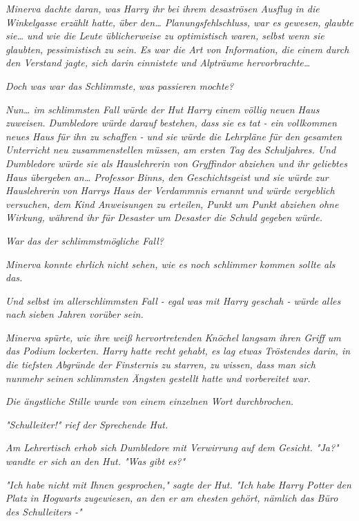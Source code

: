 {\emph{Minerva dachte daran, was Harry ihr bei ihrem desaströsen Ausflug in die Winkelgasse erzählt hatte, über den… Planungsfehlschluss, war es gewesen, glaubte sie… und wie die Leute üblicherweise zu optimistisch waren, selbst wenn sie glaubten, pessimistisch zu sein. Es war die Art von Information, die einem durch den Verstand jagte, sich darin einnistete und Alpträume hervorbrachte…}

\emph{Doch was war das} \emph{\emph{Schlimmste,}} \emph{was passieren mochte?}

\emph{Nun… im schlimmsten Fall würde der Hut Harry einem völlig neuen Haus zuweisen. Dumbledore würde darauf bestehen, dass sie es tat - ein vollkommen neues Haus für ihn zu schaffen - und sie würde die Lehrpläne für den gesamten Unterricht neu zusammenstellen müssen, am ersten Tag des Schuljahres. Und Dumbledore würde sie als Hauslehrerin von Gryffindor abziehen und ihr geliebtes Haus übergeben an… Professor Binns, den Geschichtsgeist und sie würde} \emph{zur} \emph{Hauslehrerin} \emph{von} \emph{Harrys Haus der Verdammnis ernannt und würde vergeblich versuchen, dem Kind Anweisungen zu erteilen, Punkt um Punkt abziehen ohne Wirkung, während ihr für Desaster um Desaster die Schuld gegeben würde.}

\emph{War das der schlimmstmögliche Fall?}

\emph{Minerva konnte ehrlich nicht sehen, wie es noch schlimmer kommen sollte als das.}

\emph{Und selbst im allerschlimmsten Fall - egal} \emph{\emph{was}} \emph{mit Harry geschah - würde} \emph{alles} \emph{nach} \emph{sieben Jahren vorüber sein.}

\emph{Minerva spürte, wie ihre weiß hervortretenden Knöchel langsam ihren Griff um das Podium lockerten. Harry hatte recht gehabt, es lag etwas} \emph{Tröstendes} \emph{darin, in die tiefsten Abgründe der Finsternis zu starren, zu wissen, dass man sich nunmehr seinen schlimmsten Ängsten gestellt hatte und vorbereitet war.}

\emph{Die ängstliche Stille wurde von einem einzelnen Wort durchbrochen.}

\emph{"Schulleiter!" rief der Sprechende Hut.}

\emph{Am Lehrertisch erhob sich Dumbledore mit Verwirrung auf dem Gesicht. "Ja?" wandte er sich an den Hut. "Was gibt es?"}

\emph{"Ich habe nicht mit Ihnen gesprochen," sagte der Hut. "Ich habe Harry Potter den Platz in Hogwarts zugewiesen, an den er am ehesten gehört, nämlich das Büro des Schulleiters -"}

}

